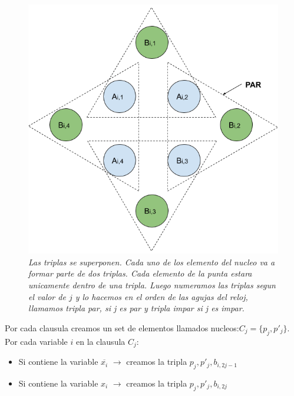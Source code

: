 \documentclass{article}
\begin{document}
\begin{figure}[h!]
    \begin{center} 
    \includegraphics[scale=0.3]{imagenes/ejemplo-3dm-gadget-clausula-xi.png}
    \caption{\small \sl Las triplas se superponen. Cada uno de los elemento del nucleo va a formar parte de dos triplas. Cada elemento 
    de la punta estara unicamente dentro de una tripla. Luego numeramos las triplas segun el valor de \(j\) y lo hacemos 
    en el orden de las agujas del reloj, \textit{llamamos tripla par, si j es par y tripla impar si j es impar}.} 
    \end{center}
\end{figure}

Por cada clausula creamos un set de elementos llamados nucleos:\(C_j=\{p_j,p'_j\}\). Por cada
variable \(i\) en la clausula \(C_j\):
\begin{itemize}
    \item Si contiene la variable \(\overline{x_i}\) \(\rightarrow\) creamos la tripla \(p_j, p'_j, b_{i,2j-1}\)
    \item Si contiene la variable \(x_i\) \(\rightarrow\) creamos la tripla \(p_j, p'_j, b_{i,2j}\)
\end{itemize}
\end{document}
